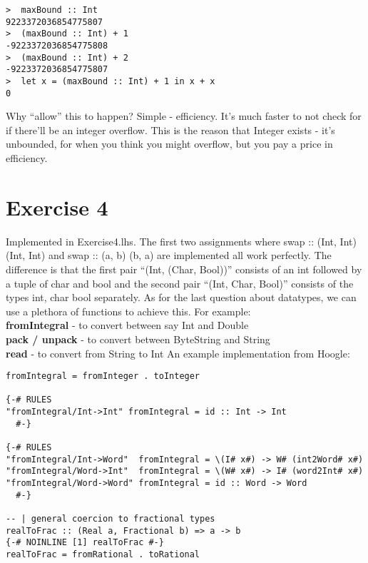 \documentclass{article}
\begin{document}
\begin{lstlisting}
>  maxBound :: Int
9223372036854775807
>  (maxBound :: Int) + 1
-9223372036854775808
>  (maxBound :: Int) + 2
-9223372036854775807
>  let x = (maxBound :: Int) + 1 in x + x
0
\end{lstlisting}
Why ``allow'' this to happen? Simple - efficiency. It's much faster to not check for if there'll be an integer overflow. This is the reason that Integer exists - it's unbounded, for when you think you might overflow, but you pay a price in efficiency.


\section*{Exercise 4}
Implemented in Exercise4.lhs.
The first two assignments where swap :: (Int, Int) (Int, Int) and swap :: (a, b)  (b, a) are implemented all work perfectly.
\newline
\newline
The difference is that the first pair ``(Int, (Char, Bool))'' consists of an int followed by a tuple of char and bool and the second pair ``(Int, Char, Bool)'' consists of the types int, char bool separately.
As for  the last question about datatypes, we can use a plethora of functions to achieve this. For example: \\
\textbf{fromIntegral} - to convert between say Int and Double\\
\textbf{pack / unpack} - to convert between ByteString and String\\
\textbf{read} - to convert from String to Int
\newline
An example implementation from Hoogle:
\begin{lstlisting}
fromIntegral = fromInteger . toInteger

{-# RULES
"fromIntegral/Int->Int" fromIntegral = id :: Int -> Int
  #-}

{-# RULES
"fromIntegral/Int->Word"  fromIntegral = \(I# x#) -> W# (int2Word# x#)
"fromIntegral/Word->Int"  fromIntegral = \(W# x#) -> I# (word2Int# x#)
"fromIntegral/Word->Word" fromIntegral = id :: Word -> Word
  #-}

-- | general coercion to fractional types
realToFrac :: (Real a, Fractional b) => a -> b
{-# NOINLINE [1] realToFrac #-}
realToFrac = fromRational . toRational
\end{lstlisting}
\end{document}
